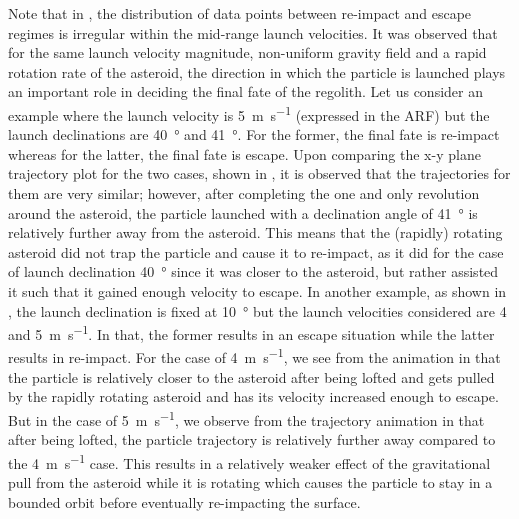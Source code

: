 %
\newline\newline
%
Note that in , the distribution of data points between re-impact and escape regimes is irregular within the mid-range launch velocities. It was observed that for the same launch velocity magnitude, non-uniform gravity field and a rapid rotation rate of the asteroid, the direction in which the particle is launched plays an important role in deciding the final fate of the regolith. Let us consider an example where the launch velocity is \SI{5}{\metre\per\second} (expressed in the \gls{ARF}) but the launch declinations are \SI{40}{\degree} and \SI{41}{\degree}. For the former, the final fate is re-impact whereas for the latter, the final fate is escape. Upon comparing the x-y plane trajectory plot for the two cases, shown in , it is observed that the trajectories for them are very similar; however, after completing the one and only revolution around the asteroid, the particle launched with a declination angle of \SI{41}{\degree} is relatively further away from the asteroid. This means that the (rapidly) rotating asteroid did not trap the particle and cause it to re-impact, as it did for the case of launch declination \SI{40}{\degree} since it was closer to the asteroid, but rather assisted it such that it gained enough velocity to escape.
%
\newline\newline
%
In another example, as shown in , the launch declination is fixed at \SI{10}{\degree} but the launch velocities considered are 4 and \SI{5}{\metre\per\second}. In that, the former results in an escape situation while the latter results in re-impact. For the case of \SI{4}{\metre\per\second}, we see from the animation in  that the particle is relatively closer to the asteroid after being lofted and gets pulled by the rapidly rotating asteroid and has its velocity increased enough to escape. But in the case of \SI{5}{\metre\per\second}, we observe from the trajectory animation in  that after being lofted, the particle trajectory is relatively further away compared to the \SI{4}{\metre\per\second} case. This results in a relatively weaker effect of the gravitational pull from the asteroid while it is rotating which causes the particle to stay in a bounded orbit before eventually re-impacting the surface.
